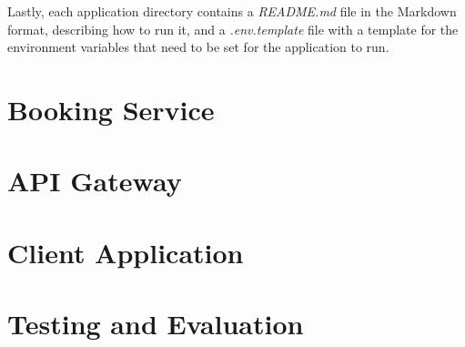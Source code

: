 Lastly, each application directory contains a \textit{README.md} file in the Markdown format, describing how to run it, and a \textit{.env.template} file with a template for the environment variables that need to be set for the application to run.

\section{Booking Service}
\label{part:i_booking_service}



\section{API Gateway}
\label{part:i_api_gateway}



\section{Client Application}
\label{part:i_client_application}



\section{Testing and Evaluation}
\label{part:testing_and_evaluation}


